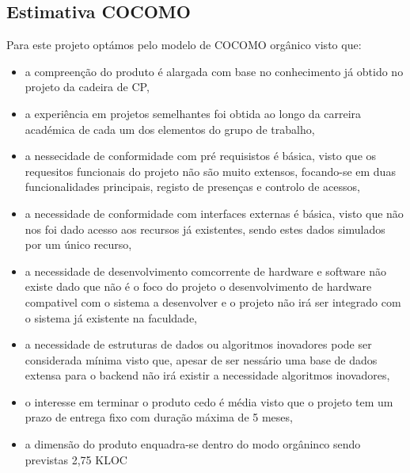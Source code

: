 \documentclass[a4paper]{report}
\begin{document}
\subsection{Estimativa COCOMO}
Para este projeto optámos pelo modelo de COCOMO orgânico visto que:
\begin{itemize}
\item a compreenção do produto é alargada com base no conhecimento já obtido no projeto da cadeira de CP, 
\item a experiência em projetos semelhantes foi obtida ao longo da carreira académica de cada um dos elementos do grupo de trabalho, 
\item a nessecidade de conformidade com pré requisistos é básica, visto que os requesitos funcionais do projeto não são muito extensos, focando-se em duas funcionalidades principais, registo de presenças e controlo de acessos,
\item a necessidade de conformidade com interfaces externas é básica, visto que não nos foi dado acesso aos recursos já existentes, sendo estes dados simulados por um único recurso,
\item a necessidade de desenvolvimento comcorrente de hardware e software não existe dado que não é o foco do projeto o desenvolvimento de hardware compativel com o sistema a desenvolver e o projeto não irá ser integrado com o sistema já existente na faculdade,
\item a necessidade de estruturas de dados ou algoritmos inovadores pode ser considerada mínima visto que, apesar de ser nessário uma base de dados extensa para o backend não irá existir a necessidade algoritmos inovadores,
\item o interesse em terminar o produto cedo é média visto que o projeto tem um prazo de entrega fixo com duração máxima de 5 meses,
\item a dimensão do produto enquadra-se dentro do modo orgâninco sendo previstas 2,75 KLOC
\end{itemize}
\end{document}
